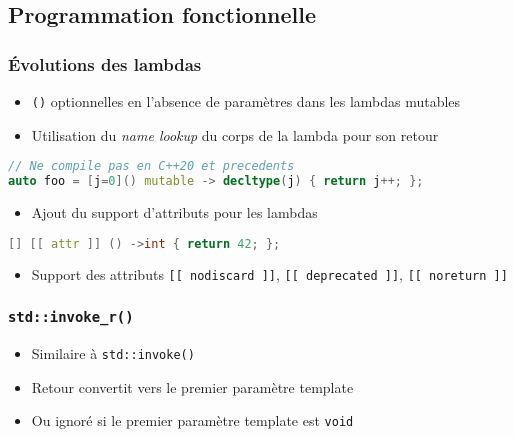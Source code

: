 \documentclass[C++.tex]{subfiles}
\begin{document}
\subsection*{Programmation fonctionnelle}
\begin{frame}[fragile]
	\frametitle{Évolutions des lambdas}
	\begin{itemize}
		\item \lstinline|()| optionnelles en l'absence de paramètres dans les lambdas mutables


		\item Utilisation du \textit{name lookup} du corps de la lambda pour son retour
	\end{itemize}

	\begin{lstlisting}[language=C++]
// Ne compile pas en C++20 et precedents
auto foo = [j=0]() mutable -> decltype(j) { return j++; };\end{lstlisting}


	\begin{itemize}
		\item Ajout du support d'attributs pour les lambdas
	\end{itemize}

	\begin{lstlisting}[language=C++]
[] [[ attr ]] () ->int { return 42; };\end{lstlisting}

	\begin{itemize}
		\item Support des attributs \lstinline|[[ nodiscard ]]|, \lstinline|[[ deprecated ]]|, \lstinline|[[ noreturn ]]|
	\end{itemize}
\end{frame}

\begin{frame}[fragile]
	\frametitle{\lstinline|std::invoke_r()|}
	\begin{itemize}
		\item Similaire à \lstinline|std::invoke()|
		\item Retour convertit vers le premier paramètre template
		\item Ou ignoré si le premier paramètre template est \lstinline|void|
	\end{itemize}
\end{frame}
\end{document}
